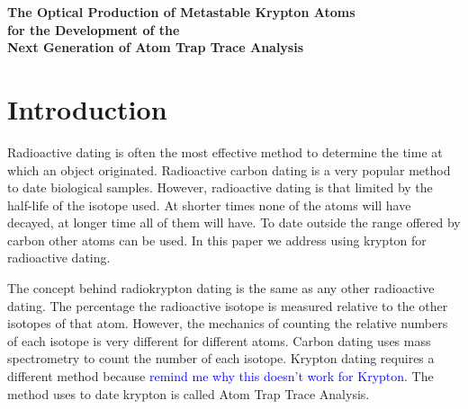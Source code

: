 \documentclass[prb,preprint]{revtex4-1}
\begin{document}
\begin{titlepage}
\thispagestyle{empty}
\begin{center}

\fontsize{20pt}{20pt}\text{   }
\vspace{30mm}

{\fontsize{18pt}{18pt}\selectfont \textbf{The Optical Production of Metastable Krypton Atoms \\ for the Development of the \\ Next Generation of Atom Trap Trace Analysis}}


\vfill
{\fontsize{14pt}{14pt}\selectfont {}}

\vfill




\vfill
{\fontsize{14pt}{14pt} \selectfont {}}


\vfill
{}
\vfill

\end{center}
\end{titlepage}


\section{Introduction} 

Radioactive dating is often the most effective method to determine the time at which an object originated. Radioactive carbon dating is a very popular method to date biological samples. However, radioactive dating is that limited by the half-life of the isotope used. At shorter times none of the atoms will have decayed, at longer time all of them will have. To date outside the range offered by carbon other atoms can be used. In this paper we address using krypton for radioactive dating.

The concept behind radiokrypton dating is the same as any other radioactive dating. The percentage the radioactive isotope is measured relative to the other isotopes of that atom. However, the mechanics of counting the relative numbers of each isotope is very different for different atoms. Carbon dating uses mass spectrometry to count the number of each isotope. Krypton dating requires a different method because \textcolor{blue}{remind me why this doesn't work for Krypton.} The method uses to date krypton is called Atom Trap Trace Analysis.
\end{document}
